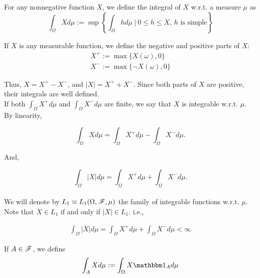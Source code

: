 \documentclass[../TGMAFFIRO.tex]{subfiles}
\begin{document}
\begin{definition}
	For any nonnegative function $X$, we define the integral of $X$ w.r.t. a measure $\mu$ as
	\begin{equation}
		\int_\Omega Xd\mu := \sup\left\{\int_\Omega h d\mu \ | \ 0 \leq h \leq X \text{, $h$ is simple}\right\}
	\end{equation}
\end{definition}

If $X$ is any measurable function, we define the negative and positive parts of $X$:
\begin{align}
	X^+ := \max\{X(\omega), 0\} \\
	X^- := \max\{-X(\omega), 0\}
\end{align}

Thus, $X = X^+ - X^-$, and $|X| = X^+ + X^-$. Since both parts of $X$ are positive, their integrals are well defined.\\

If both $\int_\Omega X^+ d\mu$ and $\int_\Omega X^- d\mu$ are finite, we say that $X$ is integrable w.r.t. $\mu$. By linearity, 

\begin{equation}
	\int_\Omega X d\mu = \int_\Omega X^+ d\mu - \int_\Omega X^- d\mu.
\end{equation}

And,

\begin{equation}
	\int_\Omega |X| d\mu = \int_\Omega X^+ d\mu + \int_\Omega X^- d\mu.
\end{equation} \\

We will denote by $L_1 \equiv L_1(\Omega, \mathscr{F}, \mu)$ the family of integrable functions w.r.t. $\mu$. Note that $X \in L_1$ if and only if $|X| \in L_1$. i.e.,

\begin{align}
	\int_\Omega |X| d\mu = \int_\Omega X^+ d\mu + \int_\Omega X^- d\mu < \infty
\end{align}

If $A \in \mathscr{F}$, we define
\begin{equation}
	\int_A X d\mu := \int_\Omega X \ind_A d\mu
\end{equation}
\end{document}
